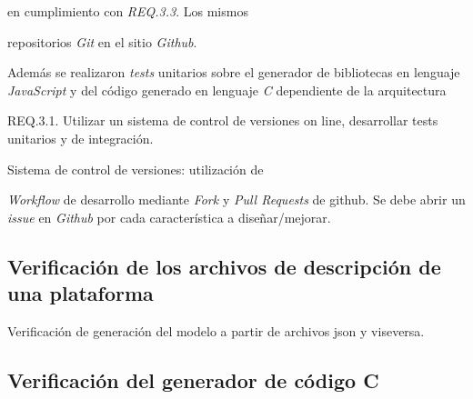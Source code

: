 en cumplimiento con \emph{REQ.3.3}. Los mismos

repositorios \emph{Git} en el sitio \emph{Github}. 


Además se realizaron \emph{tests} unitarios sobre el generador de bibliotecas en lenguaje \emph{JavaScript} y del código generado en lenguaje \emph{C} dependiente de la arquitectura 


REQ.3.1. Utilizar un sistema de control de versiones on line, desarrollar tests unitarios y de integración.

Sistema de control de versiones: utilización de 

\emph{Workflow} de desarrollo mediante \emph{Fork} y \emph{Pull Requests} de github. Se debe abrir un \emph{issue} en \emph{Github} por cada característica a diseñar/mejorar.
















\subsection{Verificación de los archivos de descripción de una plataforma}

Verificación de generación del modelo a partir de archivos json y viseversa.

\subsection{Verificación del generador de código C}

